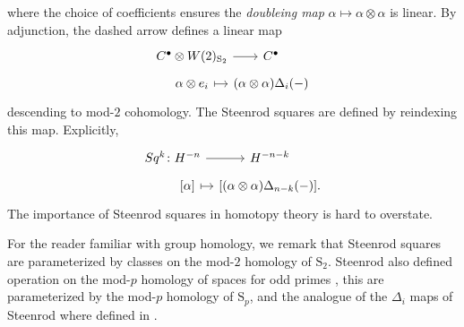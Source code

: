 where the choice of coefficients ensures the \textit{doubleing map} $\alpha \mapsto \alpha \otimes \alpha$ is linear.
By adjunction, the dashed arrow defines a linear map
\begin{equation*}
\begin{tikzcd}[row sep=tiny, column sep = tiny]
C^\bullet \otimes W(2)_{\mathrm S_2} \arrow[r] &[-10pt] C^\bullet \\
\alpha \otimes e_i \arrow[r, |->] & (\alpha \otimes \alpha)\Delta_i(-)
\end{tikzcd}
\end{equation*}
descending to mod-$2$ cohomology. The Steenrod squares are defined by reindexing this map. Explicitly,
\begin{equation*}
\begin{tikzcd}[row sep=tiny, column sep=tiny]
Sq^k \colon H^{-n} \arrow[r] & H^{-n-k} \\
\phantom{Sq^k \colon}{[\alpha]} \arrow[r, |->] & {\left[(\alpha \otimes \alpha)\Delta_{n-k}(-) \right]}.
\end{tikzcd}
\end{equation*}
The importance of Steenrod squares in homotopy theory is hard to overstate.

\begin{remark}
	For the reader familiar with group homology, we remark that Steenrod squares are parameterized by classes on the mod-$2$ homology of $\mathrm S_2$.
	Steenrod also defined operation on the mod-$p$ homology of spaces for odd primes \cite{}, this are parameterized by the mod-$p$ homology of $\mathrm S_p$, and the analogue of the $\Delta_i$ maps of Steenrod where defined in \cite{medina2020odd}.
\end{remark}